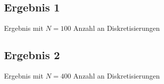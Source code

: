 \subsection{Ergebnis 1}
Ergebnis mit $N=100$ Anzahl an Diskretisierungen 


\subsection{Ergebnis 2}
Ergebnis mit $N=400$ Anzahl an Diskretisierungen 
























